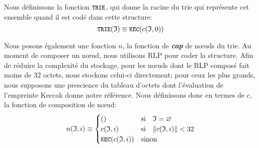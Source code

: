 \documentclass[9pt,oneside]{amsart}
\begin{document}
Nous définissons la fonction $\texttt{\small TRIE}$, qui donne la racine du trie qui représente cet ensemble quand il est codé dans cette structure:
\begin{equation}
\texttt{\small TRIE}(\mathfrak{I}) \equiv \texttt{\small KEC}(c(\mathfrak{I}, 0))
\end{equation}

Nous posons également une fonction $n$, la fonction de \textbf{\textit{cap}} de n\oe{}uds du trie. Au moment de composer un n\oe{}ud, nous utilisons RLP pour coder la structure. Afin de réduire la complexité du stockage, pour les n\oe{}uds dont le RLP composé fait moins de 32 octets, nous stockons celui-ci directement; pour ceux les plus grands, nous supposons une prescience du tableau d'octets dont l'évaluation de l'empreinte Keccak donne notre référence. Nous définissons donc en termes de $c$, la fonction de composition de n\oe{}ud:
\begin{equation}
n(\mathfrak{I}, i) \equiv \begin{cases}
() & \text{si} \quad \mathfrak{I} = \varnothing \\
c(\mathfrak{I}, i) & \text{si} \quad \lVert c(\mathfrak{I}, i)\rVert < 32 \\
\texttt{\small KEC}(c(\mathfrak{I}, i)) & \text{sinon}
\end{cases}
\end{equation}
\end{document}
